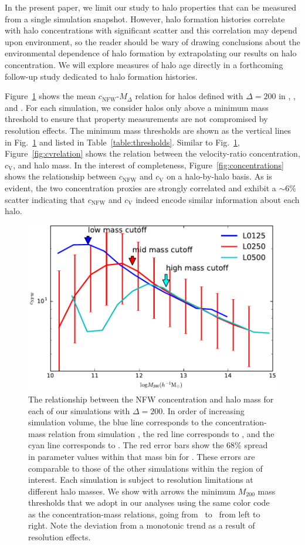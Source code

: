 \documentclass[usenatbib,fleqn]{mnras}
\begin{document}
In the present paper, we limit our study to halo properties that can be measured from a single simulation 
snapshot. However, halo formation histories correlate with halo concentrations with significant scatter and this correlation may 
depend upon environment, so the reader should be wary of drawing conclusions about the environmental dependence of 
halo formation by extrapolating our results on halo concentration. 
We will explore measures of halo age directly in a forthcoming follow-up study dedicated to halo 
formation histories.

Figure~\ref{fig:cnfwrelation} shows the mean $c_{\mathrm{NFW}}$-$M_{\Delta}$ relation for halos defined with
$\Delta=200$ in \simA, \simB, and \simC. For each simulation, we consider halos only above a minimum mass threshold 
to ensure that property measurements are not compromised by resolution effects. The minimum mass 
thresholds are shown as the vertical lines in Fig.~\ref{fig:cnfwrelation} and listed in Table~\ref{table:thresholds}. 
Similar to Fig.~\ref{fig:cnfwrelation}, Figure~\ref{fig:cvrelation} shows the relation between the 
velocity-ratio concentration, $c_{\mathrm{V}}$, and halo mass. 
In the interest of completeness, Figure~\ref{fig:concentrations} shows the relationship 
between $c_{\mathrm{NFW}}$ and $c_{\mathrm{V}}$ on a halo-by-halo basis. As is evident, 
the two concentration proxies are strongly correlated and exhibit a $\sim 6\%$ scatter indicating 
that $c_{\mathrm{NFW}}$ and $c_{\mathrm{V}}$ indeed encode similar information about each 
halo.

\begin{figure}
\centering
\includegraphics[width=.45\textwidth]{masscut_cNFW_d200.pdf}
\caption{
The relationship between the NFW concentration and halo mass for each of our simulations with $\Delta =200$. 
In order of increasing simulation volume, the blue line corresponds to the concentration-mass relation from simulation 
\simA, the red line corresponds to \simB, and the cyan line corresponds to \simC. The red error bars show the 68\% spread in
parameter values within that mass bin for \simB. These errors are comparable to those of the other simulations
within the region of interest.
Each simulation is subject to resolution limitations at different halo masses. We show with arrows 
the minimum $M_{200}$ mass thresholds that we adopt in our analyses using the same color code as 
the concentration-mass relations, going from \simA \ to \simC \ from left to right. Note the deviation from a monotonic trend as a result of resolution effects.}
\label{fig:cnfwrelation}
\end{figure}
\end{document}
